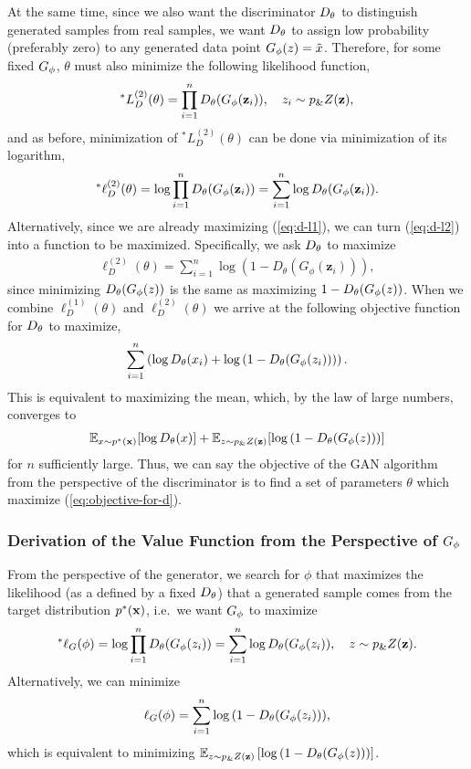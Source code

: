 At the same time, since we also want the discriminator $D_\theta$ to
distinguish generated samples from real samples, we want $D_\theta$ to
assign low probability (preferably zero) to any generated data point
$G_\phi(z) = \tilde{x}$.  Therefore, for some fixed $G_\phi$, $\theta$
must also minimize the following likelihood function,
\begin{align}
  ^*L_{D}^{(2)}(\theta) = \prod_{i=1}^n D_\theta(G_\phi(\mathbf{z}_i)), \quad z_i \sim p_\&Z(\mathbf{z}),
\end{align}
and as before, minimization of $^*L_{D}^{(2)}(\theta)$ can be done via
minimization of its logarithm,
\begin{align}
  \label{eq:d-l2} ^*\ell_{D}^{(2)}(\theta) = \log \prod_{i=1}^n D_\theta(G_\phi(\mathbf{z}_i)) = \sum_{i=1}^n \log D_\theta (G_\phi(\mathbf{z}_i)).
\end{align}
Alternatively, since we are already maximizing (\ref{eq:d-l1}), we can
turn (\ref{eq:d-l2}) into a function to be maximized. Specifically, we
ask $D_\theta$ to maximize
\begin{align}
  \ell_{D}^{(2)}(\theta) = \sum_{i=1}^n \log{(1 - D_\theta(G_\phi(\mathbf{z}_i)))},
\end{align}
since minimizing $D_\theta(G_\phi(z))$ is the same as maximizing
$1 - D_\theta(G_\phi(z))$. When we combine $\ell_{D}^{(1)}(\theta)$ and
$\ell_{D}^{(2)}(\theta)$ we arrive at the following objective function
for $D_\theta$ to maximize,
\begin{align}
  \sum_{i=1}^n \left( \log D_\theta(x_i) + \log{(1 - D_\theta(G_\phi(z_i)))} \right).
\end{align}
This is equivalent to maximizing the mean, which, by the law of large
numbers, converges to
\begin{align}
  \label{eq:objective-for-d}
  \mathbb{E}_{x \sim p^*(\mathbf{x})}[{\log D_\theta(x})] + \mathbb{E}_{z \sim p_\&Z(\mathbf{z})}[\log{(1 - D_\theta(G_\phi(z)))}]
\end{align}
for $n$ sufficiently large. Thus, we can say the objective of the GAN
algorithm from the perspective of the discriminator is to find a set
of parameters $\theta$ which maximize (\ref{eq:objective-for-d}).

\subsubsection{Derivation of the Value Function from the Perspective of $G_\phi$}
\label{sec:derivation-g}

From the perspective of the generator, we search for $\phi$ that
maximizes the likelihood (as a defined by a fixed $D_\theta$) that a
generated sample comes from the target distribution $p^*(\mathbf{x})$, i.e.\ we
want $G_\phi$ to maximize
\begin{align}
  ^*\ell_G(\phi) = \log\prod_{i=1}^nD_\theta(G_\phi(z_i)) = \sum_{i=1}^n\log{D_\theta(G_\phi(z_i))}, \quad z \sim p_\&Z(\mathbf{z}).
\end{align}
Alternatively, we can minimize
\begin{align}
  \ell_G(\phi) = \sum_{i=1}^n\log{(1 - D_\theta(G_\phi(z_i)))},
\end{align}
which is equivalent to minimizing $\mathbb{E}_{z \sim p_\&Z(\mathbf{z})} \left[\log{(1 - D_\theta(G_\phi(z)))} \right]$.

